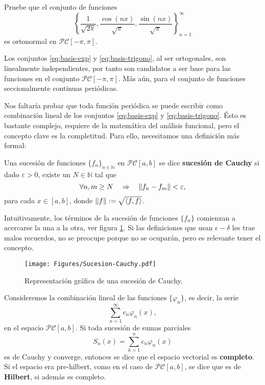 \begin{ejemplo}
Pruebe que el conjunto de funciones 
\begin{equation}
 \left\{ \frac{1}{\sqrt{2 \pi}}, \frac{\cos(nx)}{\sqrt{\pi}} ,  \frac{\sin(nx)}{\sqrt{\pi}} \right\}_{n=1}^{\infty} \label{eq:basis-trigono}  
\end{equation}
es ortonormal en $\mathcal{PC}[-\pi,\pi]$.
\end{ejemplo}

Los conjuntos \eqref{eq:basis-exp} y \eqref{eq:basis-trigono}, al ser ortogonales, son linealmente independientes, por tanto son candidatos a ser base para las funciones en el conjunto $\mathcal{PC}[-\pi,\pi]$. Más aún, para el conjunto de funciones seccionalmente continuas periódicas.

Nos faltaría probar que toda función periódica se puede escribir como combinación lineal de los conjuntos \eqref{eq:basis-exp} y \eqref{eq:basis-trigono}. Ésto es bastante complejo, requiere de la matemática del análisis funcional, pero el concepto clave es la completitud. Para ello, necesitamos una definición más formal:

\begin{defi}
Una sucesión de funciones $\{f_n\}_{n \in \mathbb{N}}$ en $\mathcal{PC}[a,b]$ se dice \textbf{sucesión de Cauchy} si dado $\varepsilon > 0$, existe un $N \in \mathbb{N}$ tal que
\begin{equation}
\forall n,m \geq N \quad \Rightarrow \quad \left\lVert f_n-f_m\right\rVert < \varepsilon,    
\end{equation}
para cada $x \in [a,b]$, donde $\left\lVert f\right\rVert := \sqrt{\langle f,f\rangle}$.
\end{defi}

Intuitivamente, los términos de la sucesión de funciones $\{f_{n}\}$ comienzan a acercarse la una a la otra, ver figura \ref{fig:Suc-Cauchy}.  Si las definiciones que usan $\epsilon-\delta$ les trae malos recuerdos, no se preocupe porque no se ocuparán, pero es relevante tener el concepto. 

\begin{figure}
    \centering
    \texttt{[image: Figures/Sucesion-Cauchy.pdf]}
    \caption{Representación gráfica de una sucesión de Cauchy.}
    \label{fig:Suc-Cauchy}
\end{figure}

Consideremos la combinación lineal de las funciones $\{\varphi_{n}\}$, es decir, la serie 
\begin{equation}
 \sum_{n = 1}^{\infty} c_n \varphi_n(x),
\end{equation}
en el espacio $\mathcal{PC}[a,b]$. Si toda sucesión de sumas parciales 
\begin{equation}
    S_n(x) = \sum_{k = 1}^{n} c_{n} \varphi_n(x)
\end{equation}
es de Cauchy y converge, entonces se dice que el espacio vectorial es \textbf{completo}. Si el espacio era pre-hilbert, como en el caso de $\mathcal{PC}[a,b]$, se dice que es de \textbf{Hilbert}, si además es completo.

